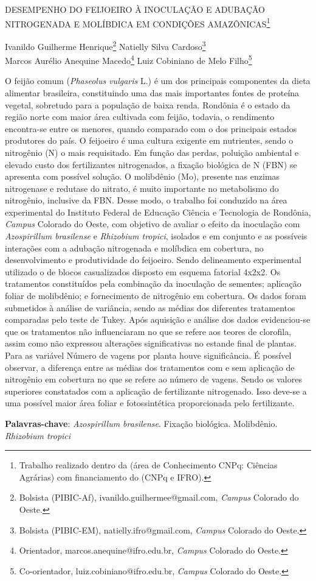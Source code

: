 \documentclass[article,12pt,onesidea,4paper,english,brazil]{abntex2}
\begin{document}
	
	
	\frenchspacing 
	
	\begin{center}
		\LARGE DESEMPENHO DO FEIJOEIRO À INOCULAÇÃO E ADUBAÇÃO NITROGENADA
		E MOLÍBDICA EM CONDIÇÕES AMAZÔNICAS\footnote{Trabalho realizado dentro da (área de Conhecimento CNPq: Ciências Agrárias) com financiamento do (CNPq e IFRO).}
		
		\normalsize
		Ivanildo Guilherme Henrique\footnote{Bolsista (PIBIC-Af), ivanildo.guilhermee@gmail.com, \textit{Campus} Colorado do Oeste.} 
		Natielly Silva Cardoso\footnote{Bolsista (PIBIC-EM), natielly.ifro@gmail.com, \textit{Campus} Colorado do Oeste.} \\
		Marcos Aurélio Anequine Macedo\footnote{Orientador, marcos.anequine@ifro.edu.br, \textit{Campus} Colorado do Oeste.} 
		Luiz Cobiniano de Melo Filho\footnote{Co-orientador, luiz.cobiniano@ifro.edu.br, \textit{Campus} Colorado do Oeste.} 
	\end{center}
	
	\noindent O feijão comum (\textit{Phaseolus vulgaris} L.) é um dos principais componentes da dieta alimentar brasileira, constituindo uma das mais importantes fontes de proteína
	vegetal, sobretudo para a população de baixa renda. Rondônia é o estado da região
	norte com maior área cultivada com feijão, todavia, o rendimento encontra-se entre
	os menores, quando comparado com o dos principais estados produtores do país. O
	feijoeiro é uma cultura exigente em nutrientes, sendo o nitrogênio (N) o mais
	requisitado. Em função das perdas, poluição ambiental e elevado custo dos
	fertilizantes nitrogenados, a fixação biológica de N (FBN) se apresenta com possível
	solução. O molibdênio (Mo), presente nas enzimas nitrogenase e redutase do
	nitrato, é muito importante no metabolismo do nitrogênio, inclusive da FBN. Desse
	modo, o trabalho foi conduzido na área experimental do Instituto Federal de
	Educação Ciência e Tecnologia de Rondônia, \textit{Campus} Colorado do Oeste, com
	objetivo de avaliar o efeito da inoculação com \textit{Azospirillum brasilense} e \textit{Rhizobium tropici}, isolados e em conjunto e as possíveis interações com a adubação
	nitrogenada e molíbdica em cobertura, no desenvolvimento e produtividade do
	feijoeiro. Sendo delineamento experimental utilizado o de blocos casualizados
	disposto em esquema fatorial 4x2x2. Os tratamentos constituídos pela combinação
	da inoculação de sementes; aplicação foliar de molibdênio; e fornecimento de
	nitrogênio em cobertura. Os dados foram submetidos à análise de variância, sendo
	as médias dos diferentes tratamentos comparadas pelo teste de Tukey. Após
	aquisição e análise dos dados evidenciou-se que os tratamentos não influenciaram
	no que se refere aos teores de clorofila, assim como não expressou alterações
	significativas no estande final de plantas. Para as variável Número de vagens por
	planta houve significância. É possível observar, a diferença entre as médias dos
	tratamentos com e sem aplicação de nitrogênio em cobertura no que se refere ao
	número de vagens. Sendo os valores superiores constatados com a aplicação de
	fertilizante nitrogenado. Isso deve-se a uma possível maior área foliar e
	fotossintética proporcionada pelo fertilizante.
	
	\vspace{\onelineskip}
	
	\noindent
	\textbf{Palavras-chave}: \textit{Azospirillum brasilense}. Fixação biológica. Molibdênio. \textit{Rhizobium tropici}
	
\end{document}
